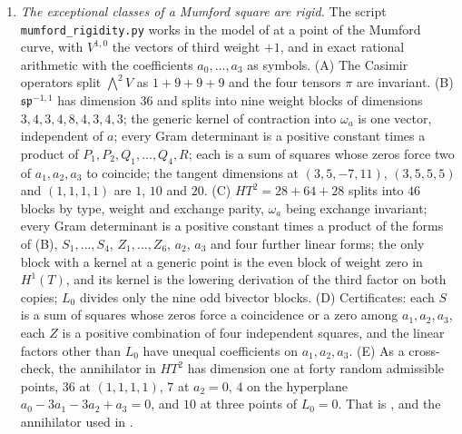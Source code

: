 \begin{enumerate}[label=\textup{(\Roman*)},leftmargin=*]
\item \emph{The exceptional classes of a Mumford square are rigid.} The
  script \texttt{mumford\_\allowbreak rigidity.py} works in the model of
   at a point of the Mumford curve, with $V^{1,0}$ the
  vectors of third weight $+1$, and in exact rational arithmetic with the
  coefficients $a_{0},\dots,a_{3}$ as symbols. (A) The Casimir operators
  split ${\textstyle\bigwedge^{2}}V$ as $1+9+9+9$ and the four tensors $\pi$ are invariant.
  (B) $\mathfrak{sp}^{-1,1}$ has dimension $36$ and splits into nine weight
  blocks of dimensions $3,4,3,4,8,4,3,4,3$; the generic kernel of contraction
  into $\omega_{a}$ is one vector, independent of $a$; every Gram determinant
  is a positive constant times a product of $P_{1},P_{2},Q_{1},\dots,Q_{4},R$;
  each is a sum of squares whose zeros force two of $a_{1},a_{2},a_{3}$ to
  coincide; the tangent dimensions at $(3,5,-7,11)$, $(3,5,5,5)$ and
  $(1,1,1,1)$ are $1$, $10$ and $20$. (C) $HT^{2}=28+64+28$ splits into $46$
  blocks by type, weight and exchange parity, $\omega_{a}$ being exchange
  invariant; every Gram determinant is a positive constant times a product of
  the forms of (B), $S_{1},\dots,S_{4}$, $Z_{1},\dots,Z_{6}$, $a_{2}$, $a_{3}$
  and four further linear forms; the only block with a kernel at a generic
  point is the even block of weight zero in $H^{1}(T)$, and its kernel is the
  lowering derivation of the third factor on both copies; $L_{0}$ divides only
  the nine odd bivector blocks. (D) Certificates: each $S$ is a sum of squares
  whose zeros force a coincidence or a zero among $a_{1},a_{2},a_{3}$, each
  $Z$ is a positive combination of four independent squares, and the linear
  factors other than $L_{0}$ have unequal coefficients on $a_{1},a_{2},a_{3}$.
  (E) As a cross-check, the annihilator in $HT^{2}$ has dimension one at forty
  random admissible points, $36$ at $(1,1,1,1)$, $7$ at $a_{2}=0$, $4$ on the
  hyperplane $a_{0}-3a_{1}-3a_{2}+a_{3}=0$, and $10$ at three points of
  $L_{0}=0$. That is ,  and
  the annihilator used in .


\end{enumerate}
